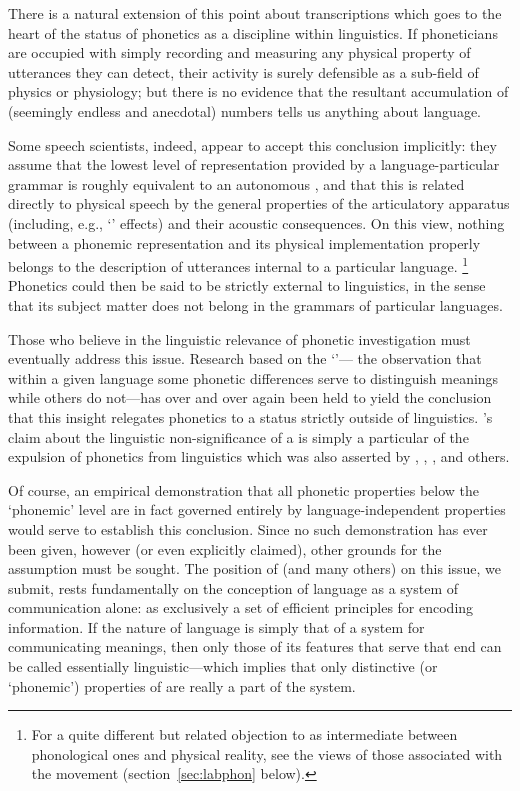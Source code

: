 There is a natural extension of this point about transcriptions which
goes to the heart of the status of phonetics as a discipline within
linguistics. If phoneticians are occupied with simply recording and
measuring any physical property of utterances they can detect, their
activity is surely defensible as a sub-field of physics or physiology;
but there is no evidence that the resultant accumulation of (seemingly
endless and anecdotal) numbers tells us anything about language.

Some speech scientists, indeed, appear to accept this conclusion
implicitly: they assume that the lowest level of representation
provided by a language-particular grammar is roughly equivalent to an
autonomous , and that this is related directly
to physical speech by the general properties of the articulatory
apparatus (including, e.g., `' effects) and their
acoustic consequences.
On this view, nothing between a phonemic
representation and its physical implementation properly belongs to the
description of utterances internal to a particular language.
\footnote{For a quite different but related objection 
to  as intermediate between phonological ones 
and physical reality, see the views of those associated with the 
 movement (section~\ref{sec:labphon} below).}  Phonetics
could then be said to be strictly external to linguistics, in the
sense that its subject matter does not belong in the grammars of
particular languages.

Those who believe in the linguistic relevance of phonetic
investigation must eventually address this issue. Research based on
the `'— the observation that within a given language
some phonetic differences serve to distinguish meanings while others
do not—has over and over again been held to yield the conclusion that
this insight relegates phonetics to a status strictly outside of
linguistics. {\Bloomfield}'s claim about the linguistic non-significance
of a  is simply a particular  of the
expulsion of phonetics from linguistics which was also asserted by
{\DeCourtenay}, {\Trubetzkoy}, {\Hjelmslev}, and others.

Of course, an empirical demonstration that all phonetic properties
below the `phonemic' level are in fact governed entirely by
language-independent properties would serve to establish this
conclusion. Since no such demonstration has ever been given, however
(or even explicitly claimed), other grounds for the assumption must be
sought. The position of {\Bloomfield} (and many others) on this issue, we
submit, rests fundamentally on the conception of language as a system
of communication alone: as exclusively a set of efficient principles
for encoding information. If the nature of language is simply that of
a system for communicating meanings, then only those of its features
that serve that end can be called essentially linguistic—which implies
that only distinctive (or `phonemic') properties of 
are really a part of the system.

